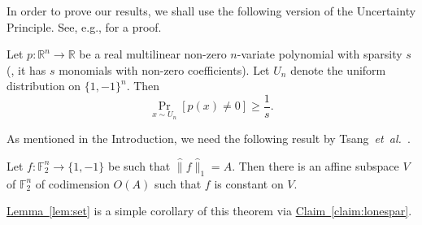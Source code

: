 \documentclass{toc}
\newcommand{\etal}{{\it et~al.}}
\newcommand{\lref}[2][]{\hyperref[#2]{#1~\ref*{#2}}}
\begin{document}
In order to prove our results, we shall use the following version of the Uncertainty Principle. See, e.g., \cite{DBLP:journals/cjtcs/GurT13} for a proof.
\begin{theorem}
\label{thm:up}
Let $p: \mathbb{R}^n \rightarrow \mathbb{R}$ be a real
%
multilinear   %
non-zero
 $n$-variate polynomial with sparsity $s$ (\ie, it has $s$ monomials with non-zero coefficients). Let $U_n$ denote the 
uniform distribution on $\{1,-1\}^n$. Then
\[\Pr_{x \sim U_n}[p(x) \neq 0] \geq \frac{1}{s}.\]
\end{theorem}
As
%
mentioned  %
in the
%
Introduction,    %
we need the following
%
%
%
%
result by Tsang~\etal~\cite[Lemma 28]{tsang}.
\begin{theorem}[Tsang~\etal]
\label{sphilka}
Let $f:\mathbb{F}_2^n \rightarrow \{1,-1\}$ be such that
$\widehat{\|}f\widehat{\|}_1=A$. Then there is an affine subspace
$V$ of $\mathbb{F}_2^n$ of codimension $O(A)$ such
that $f$ is constant on $V$.
\end{theorem}

\lref[Lemma]{lem:set} is a simple corollary of this theorem via \lref[Claim]{claim:lonespar}.
\end{document}
